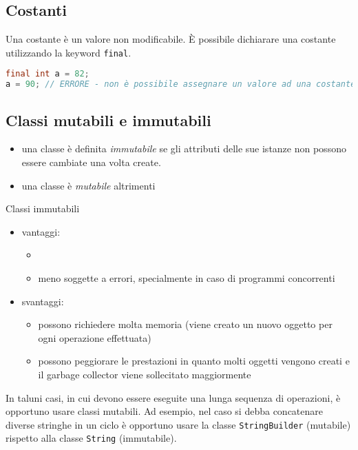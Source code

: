 \documentclass{article}
\begin{document}
\subsection{Costanti}
Una costante è un valore non modificabile.
È possibile dichiarare una costante utilizzando la keyword
\texttt{final}. 

\begin{lstlisting}[language=Java,escapechar=|]
final int a = 82;
a = 90; // ERRORE - non è possibile assegnare un valore ad una costante
\end{lstlisting}

\subsection{Classi mutabili e immutabili}
\begin{itemize}
\item una classe è definita \emph{immutabile} se gli attributi delle sue istanze non possono essere cambiate una volta create.
\item una classe è \emph{mutabile} altrimenti
\end{itemize}

Classi immutabili
\begin{itemize}
\item vantaggi:
\begin{itemize}
\item %
\item meno soggette a errori, specialmente in caso di programmi concorrenti
\end{itemize}
\item svantaggi:
\begin{itemize}
\item possono richiedere molta memoria (viene creato un nuovo oggetto per ogni operazione effettuata)
\item possono peggiorare le prestazioni in quanto molti oggetti vengono creati e il garbage collector viene sollecitato maggiormente
\end{itemize}
\end{itemize}

In taluni casi, in cui devono essere eseguite una lunga sequenza di operazioni, è opportuno usare classi mutabili.
Ad esempio, nel caso si debba concatenare diverse stringhe in un ciclo è opportuno usare la classe
\texttt{StringBuilder} (mutabile) rispetto alla classe \texttt{String} (immutabile).
\end{document}

